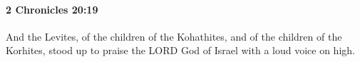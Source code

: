
		\paragraph{2 Chronicles 20:19} %
			\label{2CHRONICLES-20-19}

			And the Levites, of the children of the Kohathites, and of the children of the Korhites, stood up to praise the LORD God of Israel with a loud voice on high.


